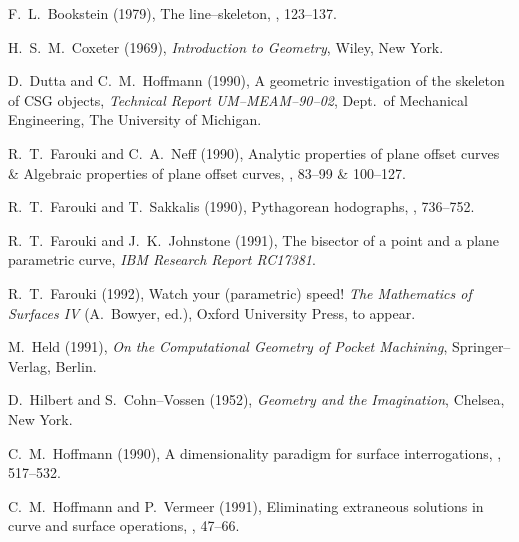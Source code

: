 \begin{thebibliography}{99}

F.~L.~Bookstein (1979), The line--skeleton, , 123--137.


H.~S.~M.~Coxeter (1969), {\it Introduction to Geometry}, Wiley,
New York.

D.~Dutta and C.~M.~Hoffmann (1990), A geometric investigation of the
skeleton of CSG objects, {\it Technical Report UM--MEAM--90--02},
Dept.\ of Mechanical Engineering, The University of Michigan.


R.~T.~Farouki and C.~A.~Neff (1990), Analytic properties of plane
offset curves \& Algebraic properties of plane offset curves,
, 83--99 \& 100--127.

R.~T.~Farouki and T.~Sakkalis (1990), Pythagorean hodographs,
, 736--752.

R.~T.~Farouki and J.~K.~Johnstone (1991), The bisector of a point and
a plane parametric curve, {\it IBM Research Report RC17381}.


R.~T.~Farouki (1992), Watch your (parametric) speed! {\it The
Mathematics of Surfaces IV\/} (A.~Bowyer, ed.), Oxford University
Press, to appear.

M.~Held (1991), {\it On the Computational Geometry of Pocket Machining},
Springer--Verlag, Berlin.

D.~Hilbert and S.~Cohn--Vossen (1952), {\it Geometry and the Imagination},
Chelsea, New York.

C.~M.~Hoffmann (1990), A dimensionality paradigm for surface interrogations,
, 517--532.

C.~M.~Hoffmann and P.~Vermeer (1991), Eliminating extraneous solutions in
curve and surface operations, , 47--66.



\end{thebibliography}

